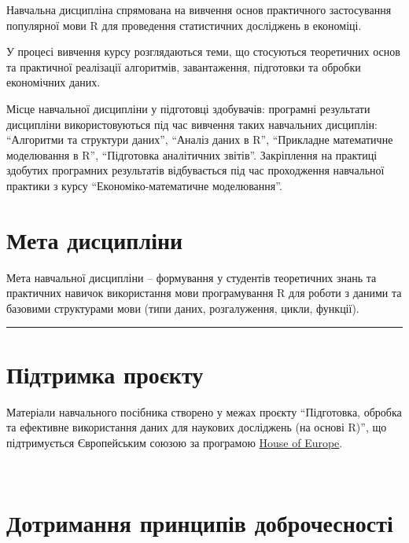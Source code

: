 \documentclass[
  letterpaper,
  DIV=11,
  numbers=noendperiod]{scrreprt}
\begin{document}
Навчальна дисципліна спрямована на вивчення основ практичного
застосування популярної мови R для проведення статистичних досліджень в
економіці.

У процесі вивчення курсу розглядаються теми, що стосуються теоретичних
основ та практичної реалізації алгоритмів, завантаження, підготовки та
обробки економічних даних.

Місце навчальної дисципліни у підготовці здобувачів: програмні
результати дисципліни використовуються під час вивчення таких навчальних
дисциплін: ``Алгоритми та структури даних'', ``Аналіз даних в R'',
``Прикладне математичне моделювання в R'', ``Підготовка аналітичних
звітів''. Закріплення на практиці здобутих програмних результатів
відбувається під час проходження навчальної практики з курсу
``Економіко-математичне моделювання''.

\hypertarget{ux43cux435ux442ux430-ux434ux438ux441ux446ux438ux43fux43bux456ux43dux438}{%
\section*{Мета
дисципліни}\label{ux43cux435ux442ux430-ux434ux438ux441ux446ux438ux43fux43bux456ux43dux438}}

Мета навчальної дисципліни -- формування у студентів теоретичних знань
та практичних навичок використання мови програмування R для роботи з
даними та базовими структурами мови (типи даних, розгалуження, цикли,
функції).

\begin{center}\rule{0.5\linewidth}{0.5pt}\end{center}

\hypertarget{ux43fux456ux434ux442ux440ux438ux43cux43aux430-ux43fux440ux43eux454ux43aux442ux443}{%
\section*{Підтримка
проєкту}\label{ux43fux456ux434ux442ux440ux438ux43cux43aux430-ux43fux440ux43eux454ux43aux442ux443}}

Матеріали навчального посібника створено у межах проєкту ``Підготовка,
обробка та ефективне використання даних для наукових досліджень (на
основі R)'', що підтримується Європейським союзою за програмою
\href{https://houseofeurope.org.ua/}{House of Europe}.

~~

\hypertarget{ux434ux43eux442ux440ux438ux43cux430ux43dux43dux44f-ux43fux440ux438ux43dux446ux438ux43fux456ux432-ux434ux43eux431ux440ux43eux447ux435ux441ux43dux43eux441ux442ux456}{%
\section*{Дотримання принципів
доброчесності}\label{ux434ux43eux442ux440ux438ux43cux430ux43dux43dux44f-ux43fux440ux438ux43dux446ux438ux43fux456ux432-ux434ux43eux431ux440ux43eux447ux435ux441ux43dux43eux441ux442ux456}}
\end{document}
